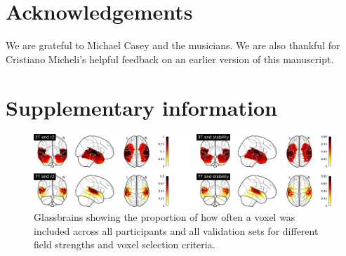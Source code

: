 \section*{Acknowledgements}

We are grateful to Michael Casey and the musicians.
We are also thankful for Cristiano Micheli's helpful feedback on an earlier version of this manuscript.




\beginsupplement
\newpage
\section*{Supplementary information} \label{supplemental}

\begin{figure}[H]
  \centering
  \includegraphics[width=\linewidth]{pics/glassbrains.png}
  \caption{Glassbrains showing the proportion of how often a voxel was included across all participants and all validation sets for different field strengths and voxel selection criteria.}

 \label{fig:glassbrains}\end{figure}



